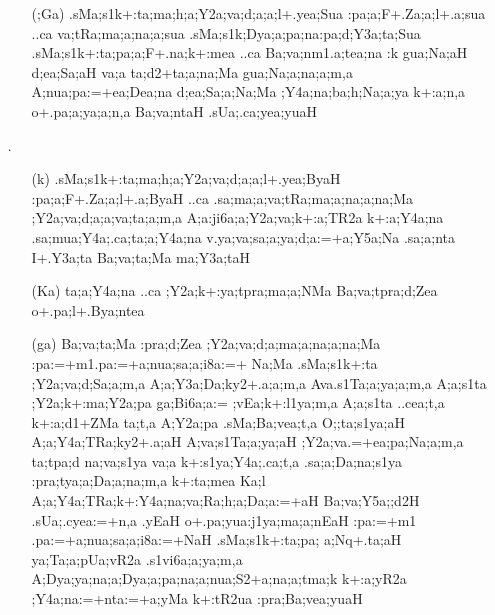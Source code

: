 \begin{spacing}{1.15}
\begin{itemize} 
\item[] \begin{itemize}
       \item[({\sktf ;Ga})] {\sktf .sMa;s1k+:ta;ma;h;a;Y2a;va;d;a;a;l+.yea;Sua
:pa;a;F+.Za;a;l+.a;sua ..ca va;tRa;ma;a;na;a;sua .sMa;s1k;Dya;a;pa;na\ZF{-}:pa;d;Y3a;ta;Sua .sMa;s1k+:ta;pa;a;F+.na;k+:mea ..ca
Ba;va;nm1.a;tea;na :k gua;Na;aH d;ea;Sa;aH
va;a ta;d2+ta;a;na;Ma gua;Na;a;na;a;m,a A;nua;pa:=+ea;Dea;na
d;ea;Sa;a;Na;Ma ;Y4a;na;ba;h;Na;a;ya k+:a;n,a o+.pa;a;ya;a;n,a Ba;va;ntaH .sUa;.ca;yea;yuaH }
 \end{itemize}
 
 \item[{\sktf 18}.]\begin{itemize}
               \item[({\sktf k})] {\sktf .sMa;s1k+:ta;ma;h;a;Y2a;va;d;a;a;l+.yea;ByaH
:pa;a;F+.Za;a;l+.a;ByaH ..ca .sa;ma;a;va;tRa;ma;a;na;a;na;Ma
;Y2a;va;d;a;a;va;ta;a;m,a A;a:ji6a;a;Y2a;va;k+:a;TR2a k+:a;Y4a;na .sa;mua;Y4a;.ca;ta;a;Y4a;na
v.ya;va;sa;a;ya;d;a:=+a;Y5a;Na .sa;a;nta I+.Y3a;ta
Ba;va;ta;Ma ma;Y3a;taH}
               
       \item[({\sktf Ka})] {\sktf ta;a;Y4a;na ..ca ;Y2a;k+:ya;tpra;ma;a;NMa
Ba;va;tpra;d;Zea o+.pa;l+.Bya;ntea}
 
       \item[({\sktf ga})] {\sktf Ba;va;ta;Ma :pra;d;Zea
;Y2a;va;d;a;ma;a;na;a;na;Ma :pa:=+m1.pa:=+a;nua;sa;a;i8a:=+%
Na;Ma .sMa;s1k+:ta ;Y2a;va;d;Sa;a;m,a
A;a;Y3a;Da{;ky2+.a;a};m,a {A}{va}{.s1Ta;a};ya;a;m,a A;a;s1ta ;Y2a;k+:ma;Y2a;pa
ga;Bi6a;a:= ;vEa;k+:l1ya;m,a A;a;s1ta
..cea;t,a\ZF{,} k+:a;d1+ZMa ta;t,a A;Y2a;pa .sMa;Ba;vea;t,a
O;;ta;s1ya;aH A;a;Y4a;TRa;ky2+.a;aH A;va;s1Ta;a;ya;aH {;Y2a;va}.=+ea;pa;Na;a;m,a\ZF{,} ta;tpa;d na;va;s1ya va;a
k+:s1ya;Y4a;.ca;t,a .sa;a;Da;na;s1ya :pra;tya;a;Da;a;na;m,a k+:ta;mea
Ka;l A;a;Y4a;TRa;k+:Y4a;na;va;Ra;h;a;Da;a:=+aH
Ba;va;Y5a;;d2H .sUa;.cyea:=+n,a\ZF{,} .yEaH o+.pa;yua:j1ya;ma;a;nEaH :pa:=+m1%
.pa:=+a;nua;sa;a;i8a:=+NaH .sMa;s1k+:ta;pa;%
a;Nq+.ta;aH ya;Ta;a;pUa;vR2a .s1vi6a;a;ya;m,a
A;Dya;ya;na;a;Dya;a;pa;na;a;nua;S2+a;na;a;tma;k k+:a;yR2a ;Y4a;na:=+nta:=+a;yMa k+:tR2ua :pra;Ba;vea;yuaH } 
     

\end{itemize}
\end{itemize}
\end{spacing}
